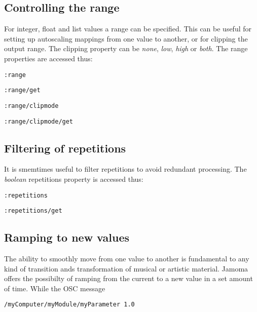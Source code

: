 \documentclass{sig-alternate}
\begin{document}




\subsection{Controlling the range} %
\label{sub:range}

For integer, float and list values a range can be specified. This can be useful for setting up autoscaling mappings from one value to another, or for clipping the output range. The clipping property can be \emph{none}, \emph{low}, \emph{high} or \emph{both}. The range properties are accessed thus:

\texttt{:range}

\texttt{:range/get}

\texttt{:range/clipmode}

\texttt{:range/clipmode/get}





\subsection{Filtering of repetitions} %
\label{sub:filtering_of_repetitions}

It is smemtimes useful to filter repetitions to avoid redundant processing. The \emph{boolean} repetitions property is accessed thus:

\texttt{:repetitions}

\texttt{:repetitions/get}





\subsection{Ramping to new values} %
\label{sub:ramping_to_new_values}

The ability to smoothly move from one value to another is fundamental to any kind of transition ands transformation of musical or artistic material. Jamoma offers the possibilty of ramping from the current to a new value in a set amount of time. While the OSC message

\texttt{/myComputer/myModule/myParameter 1.0}
\end{document}
